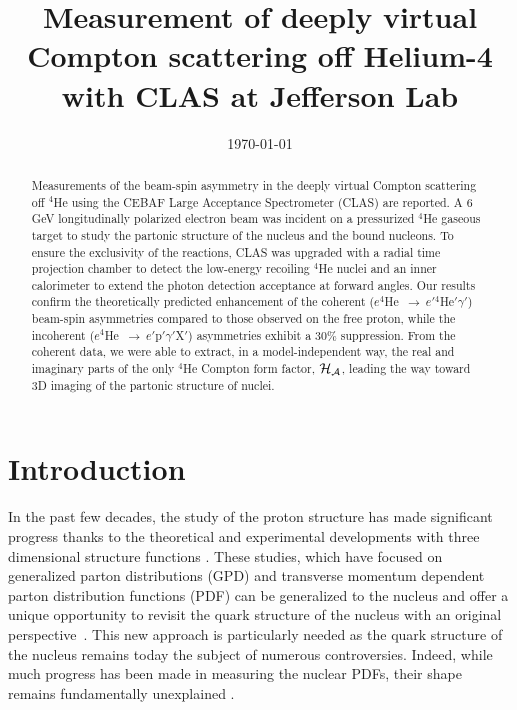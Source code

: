 \documentclass[aps,prc,preprint,superscriptaddress]{revtex4}
\begin{document}
\title{Measurement of deeply virtual Compton scattering off Helium-4 with CLAS at Jefferson Lab}



\date{\today}

\begin{abstract}
Measurements of the beam-spin asymmetry in the deeply virtual Compton 
scattering off $^4$He using the CEBAF Large Acceptance Spectrometer (CLAS) are 
reported. A 6 GeV longitudinally polarized electron beam was incident on a 
pressurized $^4$He gaseous target to study the partonic structure of the 
nucleus and the bound nucleons. To ensure the exclusivity of the reactions, 
CLAS was upgraded with a radial time projection chamber to detect the 
low-energy recoiling $^4$He nuclei and an inner calorimeter to extend the 
photon detection acceptance at forward angles. Our results confirm the 
theoretically predicted enhancement of the coherent 
($e^4$He~$\to~e'$$^4$He$'\gamma'$) beam-spin asymmetries compared to those 
observed on the free proton, while the incoherent 
($e^4$He~$\to~e'$p$'\gamma'$X$'$) asymmetries exhibit a 30$\%$ suppression.  
From the coherent data, we were able to extract, in a model-independent way, 
the real and imaginary parts of the only $^4$He Compton form factor, $\cal 
H_A$, leading the way toward 3D imaging of the partonic structure of nuclei.
\end{abstract}

\pacs{}

\maketitle

\section{Introduction}

In the past few decades, the study of the proton structure has made significant progress
thanks to the theoretical and experimental developments with three dimensional 
structure functions \cite{Anselmino:2015uka}. These studies, which have focused on generalized
parton distributions (GPD) and transverse momentum dependent parton distribution functions (PDF)
can be generalized to the nucleus and offer a unique opportunity to revisit the quark structure 
of the nucleus with an original perspective~\cite{Dupre:2015jha}. This new approach is 
particularly needed as the quark structure of the nucleus remains today the subject of numerous
controversies. Indeed, while much progress has been made in measuring the nuclear
PDFs, their shape remains fundamentally unexplained \cite{Norton:2003cb,Malace:2014uea,Hen:2016kwk}.
\end{document}
